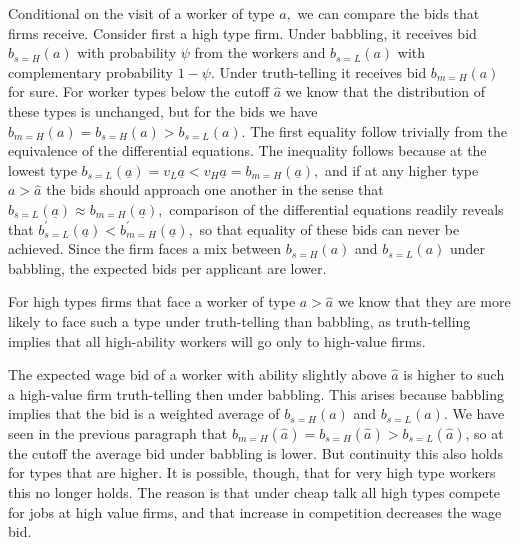 \documentclass[12pt]{article}
\begin{document}
  Conditional on the visit of a worker of type $a,$ we can compare the bids that firms receive.
  Consider first a high type firm.
  Under babbling, it receives bid $b_{s=H}(a)$ with probability $\psi $ from the workers and $b_{s=L}(a)$ with complementary probability $1-\psi .$
  Under truth-telling it receives bid $b_{m=H}(a)$ for sure.
  For worker types below the cutoff $\hat{a}$ we know that the distribution of these types is unchanged, but for the bids we have $b_{m=H}(a)=b_{s=H}(a)>b_{s=L}(a).$
  The first equality follow trivially from the equivalence of the differential equations.
  The inequality follows because at the lowest type $b_{s=L}(\underline{a})=v_{L}\underline{a} <v_{H}\underline{a}=b_{m=H}(\underline{a}),$ and if at any higher type $a> \hat{a}$ the bids should approach one another in the sense that $b_{s=L}(\underline{a})\approx b_{m=H}(\underline{a}),$ comparison of the differential equations readily reveals that $b_{s=L}^{\prime }(\underline{a})<b_{m=H}^{\prime }(\underline{a}),$ so that equality of these bids can never be achieved. Since the firm faces a mix between $b_{s=H}(a)$ and $b_{s=L}(a)$ under babbling, the expected bids per applicant are lower.


  For high types firms that face a worker of type $a>\hat{a}$ we know that they are more likely to face such a type under truth-telling than babbling, as truth-telling implies that all high-ability workers will go only to high-value firms.

  The expected wage bid of a worker with ability slightly above $\hat{a}$ is higher to such a high-value firm truth-telling then under babbling.
  This arises because babbling implies that the bid is a weighted average of $b_{s=H}(a)$ and $b_{s=L}(a).$
  We have seen in the previous paragraph that $b_{m=H}(\hat{a})=b_{s=H}(\hat{a})>b_{s=L}(\hat{a})$, so at the cutoff the average bid under babbling is lower.
  But continuity this also holds for types that are higher.
  It is possible, though, that for very high type workers this no longer holds. The reason is that under cheap talk all high types compete for jobs at high value firms, and that increase in competition decreases the wage bid. 
  
\end{document}
